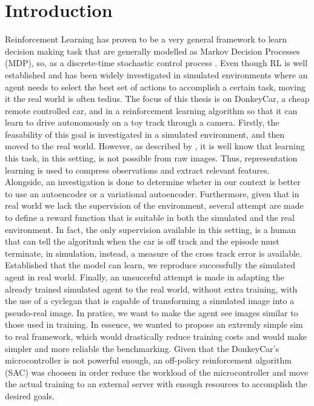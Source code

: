 \chapter{Introduction}

Reinforcement Learning has proven to be a very general framework to learn decision making task that are generally modelled as Markov Decision Processes (MDP), so, as a discrete-time stochastic control process \citep{vanOtterlo2012}. Even though RL is well established and has been widely investigated in simulated environments where an agent needs to select the best set of actions to accomplish a certain task, moving it the real world is often tedius. The focus of this thesis is on DonkeyCar, a cheap remote controlled car, and in a reinforcement learning algorithm so that it can learn to drive autonomously on a toy track through a camera. Firstly, the feasability of this goal is investigated in a simulated environment, and then moved to the real world. However, as described by \citet{DBLP:journals/corr/abs-2008-00715}, it is well know that learning this task, in this setting, is not possible from raw images. Thus, representation learning is used to compress observations and extract relevant features. Alongside, an investigation is done to determine wheter in our context is better to use an autoencoder or a variational autoencoder. Furthermore, given that in real world we lack the supervision of the environment, several attempt are made to define a reward function that is suitable in both the simulated and the real environment. In fact, the only supervision available in this setting, is a human that can tell the algoritmh when the car is off track and the episode must terminate, in simulation, instead, a measure of the cross track error is available.  Established that the model can learn, we reproduce successfully the simulated agent in real world. Finally, an unsucceful attempt is made in adapting the already trained simulated agent to the real world, without extra training, with the use of a cyclegan that is capable of transforming a simulated image into a pseudo-real image. In pratice, we want to make the agent see images similar to those used in training. In essence, we wanted to propose an extremly simple sim to real framework, which would drastically reduce training costs and would make simpler and more reliable the benchmarking. Given that the DonkeyCar's microcontroller is not powerful enough, an off-policy reinforcement algorithm (SAC) was choosen in order reduce the workload of the microcontroller and move the actual training to an external server with enough resources to accomplish the desired goals.